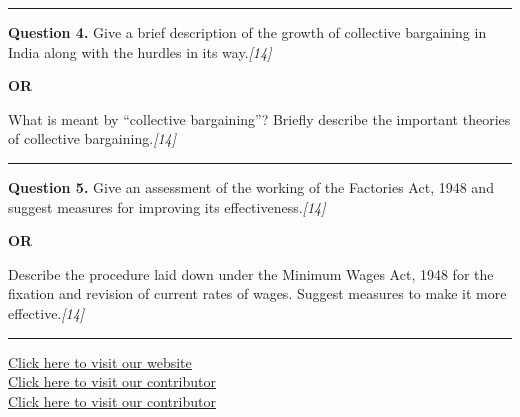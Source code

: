 \documentclass[11pt,a4paper]{article}
\newcommand{\pts}[1]{\hfill   \textit{[#1]}}
\begin{document}
\medskip\rule{\linewidth}{0.2pt}




\noindent   \textbf{Question 4.}
Give a brief description of the growth of collective bargaining in India along with the hurdles in its way.\pts{14}

\centerline{   \textbf{OR}}

What is meant by ``collective bargaining''? Briefly describe the important theories of collective bargaining.\pts{14}

\medskip\rule{\linewidth}{0.2pt}




\noindent   \textbf{Question 5.}
Give an assessment of the working of the Factories Act, 1948 and suggest measures for improving its effectiveness.\pts{14}

\centerline{   \textbf{OR}}

Describe the procedure laid down under the Minimum Wages Act, 1948 for the fixation and revision of current rates of wages. Suggest measures to make it more effective.\pts{14}

\vfill
\rule{\linewidth}{0.4pt}

\begin{center}\small
\href{https://bhu-exam.vercel.app/}{Click here to visit our website}\\[4pt]
\href{https://me-aryan.vercel.app/}{Click here to visit our contributor}\\[4pt]
\href{https://quashan-me.vercel.app/}{Click here to visit our contributor}
\end{center}
\end{document}
